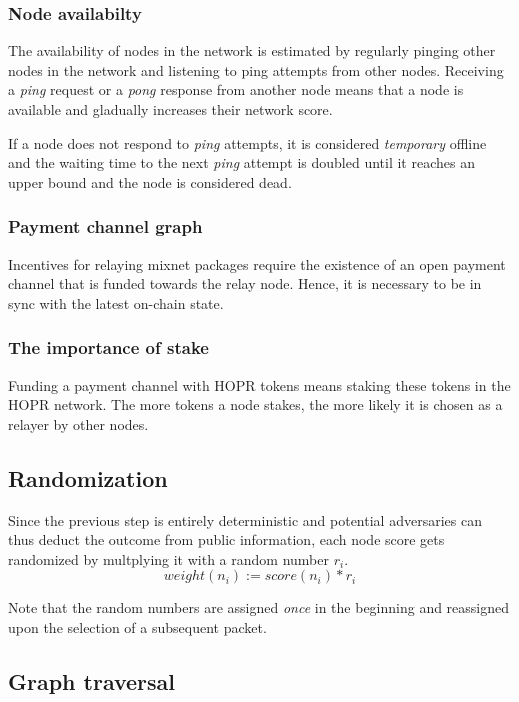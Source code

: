 \subsubsection{Node availabilty}

The availability of nodes in the network is estimated by regularly pinging other nodes in the network and listening to ping attempts from other nodes. Receiving a \textit{ping} request or a \textit{pong} response from another node means that a node is available and gladually increases their network score.

If a node does not respond to \textit{ping} attempts, it is considered \textit{temporary} offline and the waiting time to the next \textit{ping} attempt is doubled until it reaches an upper bound and the node is considered dead.

\subsubsection{Payment channel graph}

Incentives for relaying mixnet packages require the existence of an open payment channel that is funded towards the relay node. Hence, it is necessary to be in sync with the latest on-chain state.

\subsubsection{The importance of stake}

Funding a payment channel with HOPR tokens means staking these tokens in the HOPR network. The more tokens a node stakes, the more likely it is chosen as a relayer by other nodes.

\subsection{Randomization}
\label{sec:path-selection:randomization}

Since the previous step is entirely deterministic and potential adversaries can thus deduct the outcome from public information, each node score gets randomized by multplying it with a random number $r_i$.
$$weight(n_i) := score(n_i) * r_i$$

Note that the random numbers are assigned \textit{once} in the beginning and reassigned upon the selection of a subsequent packet.

\subsection{Graph traversal}
\label{sec:path-selection:graph-traversal}

